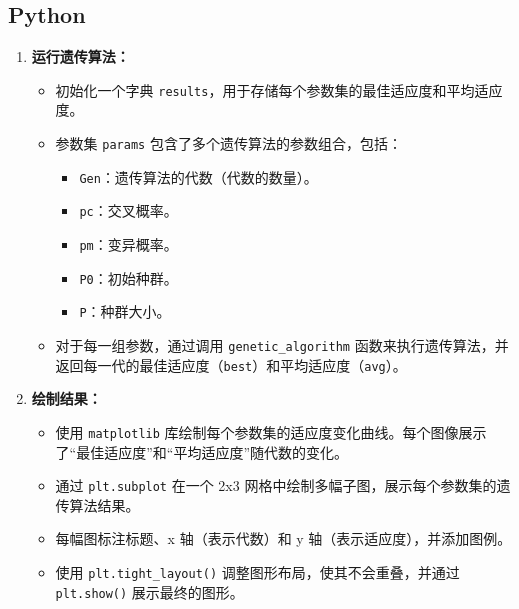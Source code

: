 \documentclass[journal,twoside,web]{ieeecolor}
\begin{document}
\subsection{Python}
\begin{enumerate}
    \item \textbf{运行遗传算法：}
    \begin{itemize}
        \item 初始化一个字典 \texttt{results}，用于存储每个参数集的最佳适应度和平均适应度。
        \item 参数集 \texttt{params} 包含了多个遗传算法的参数组合，包括：
        \begin{itemize}
            \item \texttt{Gen}：遗传算法的代数（代数的数量）。
            \item \texttt{pc}：交叉概率。
            \item \texttt{pm}：变异概率。
            \item \texttt{P0}：初始种群。
            \item \texttt{P}：种群大小。
        \end{itemize}
        \item 对于每一组参数，通过调用 \texttt{genetic\_algorithm} 函数来执行遗传算法，并返回每一代的最佳适应度（\texttt{best}）和平均适应度（\texttt{avg}）。
    \end{itemize}
    
    \item \textbf{绘制结果：}
    \begin{itemize}
        \item 使用 \texttt{matplotlib} 库绘制每个参数集的适应度变化曲线。每个图像展示了“最佳适应度”和“平均适应度”随代数的变化。
        \item 通过 \texttt{plt.subplot} 在一个 2x3 网格中绘制多幅子图，展示每个参数集的遗传算法结果。
        \item 每幅图标注标题、x 轴（表示代数）和 y 轴（表示适应度），并添加图例。
        \item 使用 \texttt{plt.tight\_layout()} 调整图形布局，使其不会重叠，并通过 \texttt{plt.show()} 展示最终的图形。
    \end{itemize}
\end{enumerate}
\end{document}
